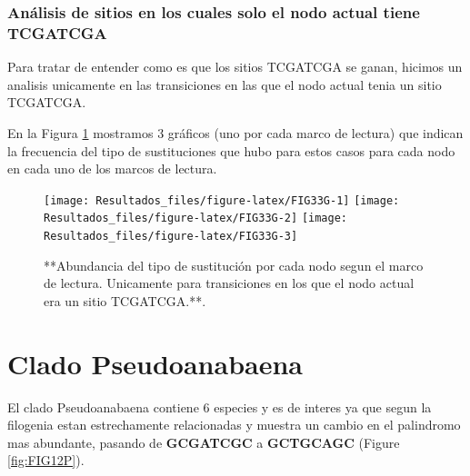 \documentclass[
]{book}
\begin{document}
\hypertarget{anuxe1lisis-de-sitios-en-los-cuales-solo-el-nodo-actual-tiene-tcgatcga}{%
\subsubsection{Análisis de sitios en los cuales solo el nodo actual tiene TCGATCGA}\label{anuxe1lisis-de-sitios-en-los-cuales-solo-el-nodo-actual-tiene-tcgatcga}}

Para tratar de entender como es que los sitios TCGATCGA se ganan, hicimos un analisis unicamente en las transiciones en las que el nodo actual tenia un sitio TCGATCGA.

En la Figura \ref{fig:FIG33G} mostramos 3 gráficos (uno por cada marco de lectura) que indican la frecuencia del tipo de sustituciones que hubo para estos casos para cada nodo en cada uno de los marcos de lectura.

\begin{figure}

{\centering \texttt{[image: Resultados\_files/figure-latex/FIG33G-1]} \texttt{[image: Resultados\_files/figure-latex/FIG33G-2]} \texttt{[image: Resultados\_files/figure-latex/FIG33G-3]} 

}

\caption{**Abundancia del tipo de sustitución por cada nodo segun el marco de lectura. Unicamente para transiciones en los que el nodo actual era un sitio TCGATCGA.**.}\label{fig:FIG33G}
\end{figure}

\hypertarget{clado-pseudoanabaena}{%
\section{Clado Pseudoanabaena}\label{clado-pseudoanabaena}}

El clado Pseudoanabaena contiene 6 especies y es de interes ya que segun la filogenia estan estrechamente relacionadas y muestra un cambio en el palindromo mas abundante, pasando de \textbf{GCGATCGC} a \textbf{GCTGCAGC} (Figure \ref{fig:FIG12P}).
\end{document}
